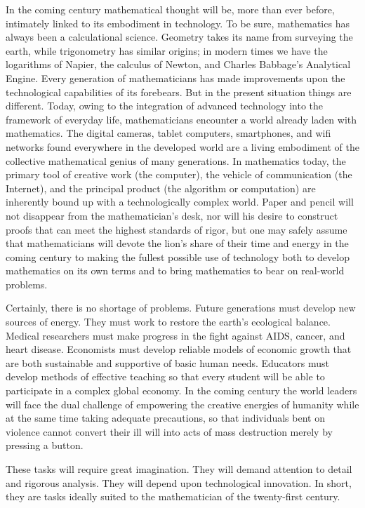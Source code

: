      In the coming century mathematical thought will be, more than ever before, intimately linked to its embodiment in technology.  To be sure, mathematics has always been a calculational science. Geometry takes its name from surveying the earth, while trigonometry has similar origins; in modern times we have the logarithms of Napier, the calculus of Newton, and Charles Babbage's Analytical Engine.  Every generation of mathematicians has made improvements upon the technological capabilities of its forebears.  But in the present situation things are different.  Today, owing to the integration of advanced technology into the framework of everyday life, mathematicians encounter a world already laden with mathematics.  The digital cameras, tablet computers, smartphones, and wifi networks found everywhere in the developed world are a living embodiment of the collective mathematical genius of many generations.  In mathematics today, the primary tool of creative work (the computer), the vehicle of communication (the Internet), and the principal product (the algorithm or computation) are inherently bound up with a technologically complex world.  Paper and pencil will not disappear from the mathematician's desk, nor will his desire to construct proofs that can meet the highest standards of rigor, but one may safely assume that mathematicians will devote the lion's share of their time and energy in the coming century to making the fullest possible use of technology both to develop mathematics on its own terms and to bring mathematics to bear on real-world problems.
       
Certainly, there is no shortage of problems.  Future generations must develop new sources of energy.  They must work to restore the earth's ecological balance.  Medical researchers must make progress in the fight against AIDS, cancer, and heart disease.  Economists must develop reliable models of economic growth that are both sustainable and supportive of basic human needs.  Educators must develop methods of effective teaching so that every student will be able to participate in a complex global economy.  In the coming century the world leaders will face the dual challenge of empowering the creative energies of humanity while at the same time taking adequate precautions, so that individuals bent on violence cannot convert their ill will into acts of mass destruction merely by pressing a button.
  
These tasks will require great imagination.  They will demand attention to detail and rigorous analysis.  They will depend upon technological innovation.  In short, they are tasks ideally suited to the mathematician of the twenty-first century.  